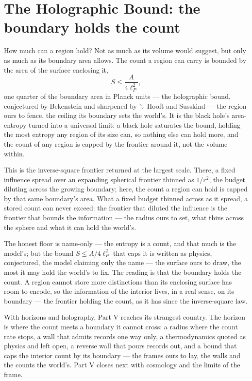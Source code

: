 \section{The Holographic Bound: the boundary holds the count}
\label{se:holographic}

How much can a region hold? Not as much as its volume would suggest, but only as much as its boundary area
allows. The count a region can carry is bounded by the area of the surface enclosing it,
\begin{equation}
  S \le \frac{A}{4\ell_P^2},
\end{equation}
one quarter of the boundary area in Planck units --- the holographic bound, conjectured by Bekenstein and
sharpened by 't~Hooft and Susskind --- the region ours to fence, the ceiling its boundary sets the world's. It
is the black hole's area-entropy turned into a universal limit: a black hole saturates the bound, holding the
most entropy any region of its size can, so nothing else can hold more, and the count of any region is capped
by the frontier around it, not the volume within.

This is the inverse-square frontier returned at the largest scale. There, a fixed influence spread over an
expanding spherical frontier thinned as $1/r^2$, the budget diluting across the growing boundary; here, the
count a region can hold is capped by that same boundary's area. What a fixed budget thinned across as it
spread, a stored count can never exceed: the frontier that diluted the influence is the frontier that bounds
the information --- the radius ours to set, what thins across the sphere and what it can hold the
world's.

The honest floor is name-only --- the entropy is a count, and that much is the model's; but the bound
$S \le A/4\ell_P^2$ that caps it is written as physics, conjectured, the model claiming only the name --- the
surface ours to draw, the most it may hold the world's to fix. The reading
is that the boundary holds the count. A region cannot store more distinctions than its enclosing surface has
room to encode, so the information of the interior lives, in a real sense, on its boundary --- the frontier
holding the count, as it has since the inverse-square law.

\bigskip

With horizons and holography, Part V reaches its strangest country. The horizon is where the count meets a
boundary it cannot cross: a radius where the count rate stops, a wall that admits records one way only, a
thermodynamics quoted as physics and left open, a reverse wall that pours records out, and a bound that
caps the interior count by its boundary --- the frames ours to lay, the walls and the counts the world's.
Part V closes next with cosmology and the limits of the frame.

